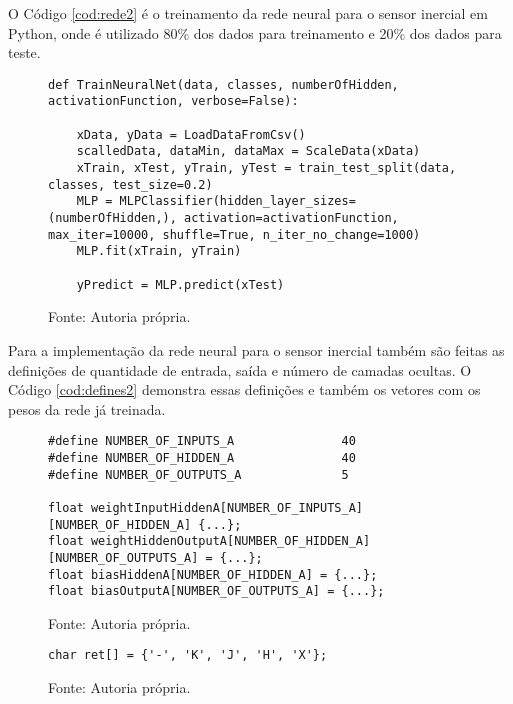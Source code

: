 O Código \ref{cod:rede2} é o treinamento da rede neural para o sensor inercial em Python, onde é utilizado 80\% dos dados para treinamento e 20\% dos dados para teste.
\begin{figure}[H]
\begin{lstlisting}[breaklines, frame=single, caption=Treinamento da rede neural do sensor inercial Python, style=CStyle, label=cod:rede2]
def TrainNeuralNet(data, classes, numberOfHidden, activationFunction, verbose=False):

	xData, yData = LoadDataFromCsv()
	scalledData, dataMin, dataMax = ScaleData(xData)
	xTrain, xTest, yTrain, yTest = train_test_split(data, classes, test_size=0.2)
	MLP = MLPClassifier(hidden_layer_sizes=(numberOfHidden,), activation=activationFunction, max_iter=10000, shuffle=True, n_iter_no_change=1000)
	MLP.fit(xTrain, yTrain)
	
	yPredict = MLP.predict(xTest)
\end{lstlisting}
\caption*{Fonte: Autoria própria.}
\end{figure}

Para a implementação da rede neural para o sensor inercial também são feitas as definições de quantidade de entrada, saída e número de camadas ocultas. O Código \ref{cod:defines2} demonstra essas definições e também os vetores com os pesos da rede já treinada.

\begin{figure}[H]
	\begin{lstlisting}[breaklines, frame=single, caption=Definições da rede neural dos sensores indutivos, style=CStyle, label=cod:defines2]
#define NUMBER_OF_INPUTS_A               40
#define NUMBER_OF_HIDDEN_A               40
#define NUMBER_OF_OUTPUTS_A              5

float weightInputHiddenA[NUMBER_OF_INPUTS_A][NUMBER_OF_HIDDEN_A] {...};
float weightHiddenOutputA[NUMBER_OF_HIDDEN_A][NUMBER_OF_OUTPUTS_A] = {...};
float biasHiddenA[NUMBER_OF_HIDDEN_A] = {...};
float biasOutputA[NUMBER_OF_OUTPUTS_A] = {...};
	\end{lstlisting}
	\caption*{Fonte: Autoria própria.}
\end{figure}

\begin{figure}[H]
\begin{lstlisting}[breaklines, frame=single, caption=Vetor de respostas possíveis do pós processamento da rede neural do sensor inercial, style=CStyle, label=cod:feedfor2]
char ret[] = {'-', 'K', 'J', 'H', 'X'};
\end{lstlisting}
\caption*{Fonte: Autoria própria.}
\end{figure}

